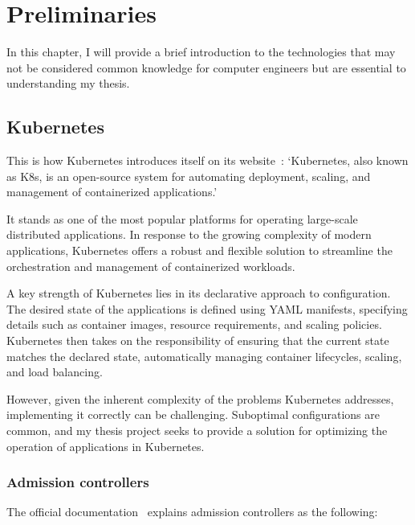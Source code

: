 \setlength{\parindent}{0pt}
\setlength{\parskip}{0.6em}

\chapter{Preliminaries}
\label{chap:prerequisites}

In this chapter, I will provide a brief introduction to the technologies that may not be considered common knowledge for computer engineers but are essential to understanding my thesis.

\section{Kubernetes}

This is how Kubernetes introduces itself on its website~\cite{K8s}: `Kubernetes, also known as K8s, is an open-source system for automating deployment, scaling, and management of containerized applications.'

It stands as one of the most popular platforms for operating large-scale distributed applications. In response to the growing complexity of modern applications, Kubernetes offers a robust and flexible solution to streamline the orchestration and management of containerized workloads.

A key strength of Kubernetes lies in its declarative approach to configuration. The desired state of the applications is defined using YAML manifests, specifying details such as container images, resource requirements, and scaling policies. Kubernetes then takes on the responsibility of ensuring that the current state matches the declared state, automatically managing container lifecycles, scaling, and load balancing.

However, given the inherent complexity of the problems Kubernetes addresses, implementing it correctly can be challenging. Suboptimal configurations are common, and my thesis project seeks to provide a solution for optimizing the operation of applications in Kubernetes.

\subsection{Admission controllers}
\label{sec:admcont}

The official documentation~\cite{K8sAdmissionOfficial} explains admission controllers as the following:

